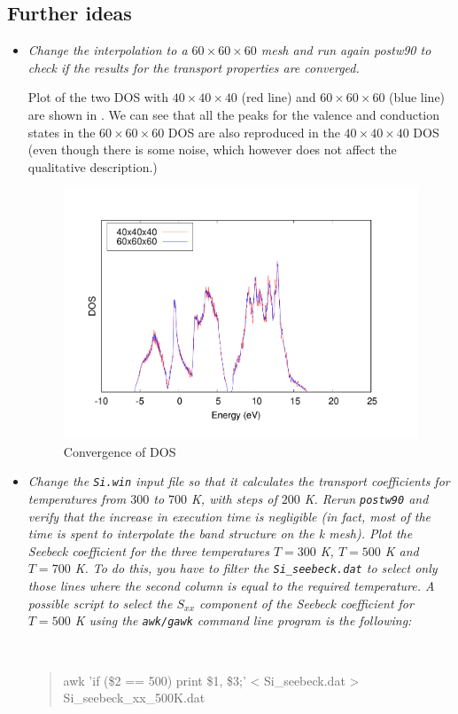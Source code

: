 \subsection*{Further ideas}
\begin{itemize}
  \item {\it Change the interpolation to a $60\times60\times60$ mesh and run again postw90 to check if the results
for the transport properties are converged.}

Plot of the two DOS with $40\times40\times40$ (red line) and $60\times60\times60$ (blue line) are shown in . We can see that all the peaks for the valence and conduction states in the $60\times60\times60$ DOS are also reproduced in the $40\times40\times40$ DOS (even though there is some noise, which however does not affect the qualitative description.)

\begin{figure}[h!]
\centering
\includegraphics[width=0.7\columnwidth]{figure/example16/Si_boltzdos_convergence.pdf}
\caption{Convergence of DOS}\label{fig16.3}
\end{figure}

  \item {\it Change the {\tt Si.win} input file so that it calculates the transport coefficients for temperatures from
$300$ to $700$ K, with steps of $200$ K. Rerun {\tt postw90} and verify that the increase in execution time
is negligible (in fact, most of the time is spent to interpolate the band structure on the k mesh).
Plot the Seebeck coefficient for the three temperatures $T = 300$ K, $T = 500$ K and $T = 700$ K.
To do this, you have to filter the {\tt Si\_seebeck.dat} to select only those lines where the second
column is equal to the required temperature. A possible script to select the $S_{xx}$ component of the
Seebeck coefficient for $T = 500$ K using the {\tt awk/gawk} command line program is the following:
{\tt
\begin{quote}
awk '{if (\$2 == 500) {print \$1, \$3;}}' < Si\_seebeck.dat > Si\_seebeck\_xx\_500K.dat
\end{quote}}
}


\end{itemize}
